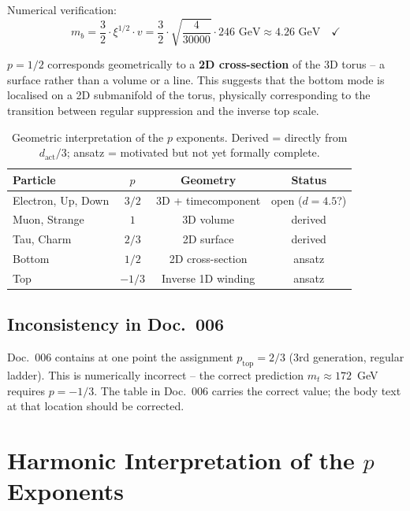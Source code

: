 Numerical verification:
\begin{equation}
    m_b = \frac{3}{2} \cdot \xi^{1/2} \cdot v
    = \frac{3}{2} \cdot \sqrt{\frac{4}{30000}} \cdot 246 \text{ GeV}
    \approx 4.26 \text{ GeV} \quad \checkmark
\end{equation}

$p = 1/2$ corresponds geometrically to a \textbf{2D cross-section}
of the 3D torus -- a surface rather than a volume or a line. This
suggests that the bottom mode is localised on a 2D submanifold of
the torus, physically corresponding to the transition between regular
suppression and the inverse top scale.

\begin{table}[htbp]
\centering\small
\begin{tabular}{lccc}
\toprule
\textbf{Particle} & $p$ & \textbf{Geometry} & \textbf{Status} \\
\midrule
Electron, Up, Down & $3/2$ & 3D + time\-component & open ($d=4.5$?) \\
Muon, Strange      & $1$   & 3D volume            & derived \\
Tau, Charm         & $2/3$ & 2D surface           & derived \\
Bottom             & $1/2$ & 2D cross-section     & ansatz \\
Top                & $-1/3$& Inverse 1D winding   & ansatz \\
\bottomrule
\end{tabular}
\caption{Geometric interpretation of the $p$ exponents.
Derived = directly from $d_{\text{act}}/3$; ansatz = motivated
but not yet formally complete.}
\label{tab:p_geometry}
\end{table}

\subsection{Inconsistency in Doc.~006}

Doc.~006 contains at one point the assignment $p_{\text{top}} = 2/3$
(3rd generation, regular ladder). This is numerically incorrect --
the correct prediction $m_t \approx 172$~GeV requires $p = -1/3$.
The table in Doc.~006 carries the correct value; the body text at
that location should be corrected.

\section{Harmonic Interpretation of the \texorpdfstring{$p$}{p} Exponents}

